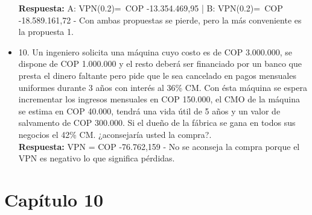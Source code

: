 \begin{itemize}
       \textbf{Respuesta:} A: VPN(0.2)=\  COP  -13.354.469,95 | B: VPN(0.2)=\  COP  -18.589.161,72 - Con ambas propuestas se pierde, pero la más conveniente es la propuesta 1.

       \medskip

 \item 10. Un ingeniero solicita una máquina cuyo costo es de COP 3.000.000, se dispone de COP 1.000.000 y el resto deberá ser financiado por un banco que presta el dinero faltante pero pide que le sea cancelado en pagos mensuales uniformes durante 3 años con  interés al 36\%  CM. Con ésta máquina se espera incrementar los ingresos mensuales en COP 150.000, el CMO de la máquina se estima en COP 40.000, tendrá una vida útil de 5 años y un valor de salvamento de COP 300.000. Si el dueño de la fábrica se gana en todos sus negocios el 42\% CM. ¿aconsejaría usted la compra?. \\

       \textbf{Respuesta:} VPN =  COP  -76.762,159 - No se aconseja la compra porque el VPN es negativo lo que significa pérdidas.

       \medskip

\end{itemize}



\chapter*{Capítulo 10}

